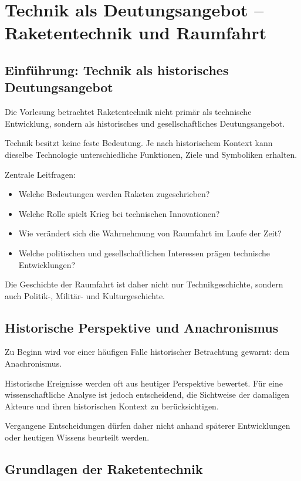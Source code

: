 \section{Technik als Deutungsangebot – Raketentechnik und Raumfahrt}

\subsection{Einführung: Technik als historisches Deutungsangebot}

Die Vorlesung betrachtet Raketentechnik nicht primär als technische Entwicklung,
sondern als historisches und gesellschaftliches Deutungsangebot.

Technik besitzt keine feste Bedeutung.
Je nach historischem Kontext kann dieselbe Technologie unterschiedliche Funktionen,
Ziele und Symboliken erhalten.

Zentrale Leitfragen:

\begin{itemize}
    \item Welche Bedeutungen werden Raketen zugeschrieben?
    \item Welche Rolle spielt Krieg bei technischen Innovationen?
    \item Wie verändert sich die Wahrnehmung von Raumfahrt im Laufe der Zeit?
    \item Welche politischen und gesellschaftlichen Interessen prägen technische Entwicklungen?
\end{itemize}

Die Geschichte der Raumfahrt ist daher nicht nur Technikgeschichte,
sondern auch Politik-, Militär- und Kulturgeschichte.

\subsection{Historische Perspektive und Anachronismus}

Zu Beginn wird vor einer häufigen Falle historischer Betrachtung gewarnt:
dem Anachronismus.

Historische Ereignisse werden oft aus heutiger Perspektive bewertet.
Für eine wissenschaftliche Analyse ist jedoch entscheidend, die Sichtweise
der damaligen Akteure und ihren historischen Kontext zu berücksichtigen.

Vergangene Entscheidungen dürfen daher nicht anhand späterer Entwicklungen
oder heutigen Wissens beurteilt werden.

\subsection{Grundlagen der Raketentechnik}

